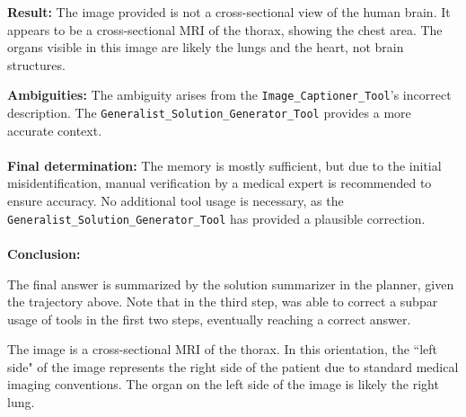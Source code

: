 \begin{executorbox}
\textbf{Result:} The image provided is not a cross-sectional view of the human brain. It appears to be a cross-sectional MRI of the thorax, showing the chest area. The organs visible in this image are likely the lungs and the heart, not brain structures.
\end{executorbox}


\begin{plannerbox}
\textbf{Ambiguities:}
The ambiguity arises from the \texttt{Image\_Captioner\_Tool}'s incorrect description. The \texttt{Generalist\_Solution\_Generator\_Tool} provides a more accurate context.
\\\\
\textbf{Final determination:}
The memory is mostly sufficient, but due to the initial misidentification, manual verification by a medical expert is recommended to ensure accuracy. No additional tool usage is necessary, as the \texttt{Generalist\_Solution\_Generator\_Tool} has provided a plausible correction.
\\\\
\textbf{Conclusion:} 
\end{plannerbox}

The final answer is summarized by the solution summarizer in the planner, given the trajectory above. Note that in the third step, \model was able to correct a subpar usage of tools in the first two steps, eventually reaching a correct answer.

\begin{answerbox}
The image is a cross-sectional MRI of the thorax. In this orientation, the ``left side" of the image represents the right side of the patient due to standard medical imaging conventions. The organ on the left side of the image is likely the right lung.
\end{answerbox}
